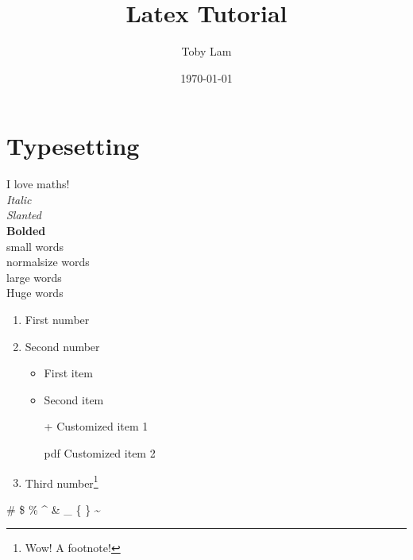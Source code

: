 \documentclass[a4paper]{report}
\begin{document}
\title{\Huge Latex Tutorial}
\author{Toby Lam}
\date{\today}
\maketitle

\tableofcontents

\newpage

\chapter{Typesetting}
\label{interests}

\indent
\indent
I love maths! \\

\noindent
\textit{Italic} \\
\textsl{Slanted} \\
\textbf{Bolded} \\

\noindent
{\small small words} \\
{\normalsize normalsize words} \\
{\large large words} \\

\vspace{2pt}
\noindent
{\huge Huge \hspace{10pt} words} \\

\normalsize

\begin{enumerate}
	\item First number
	\item Second number
	\begin{itemize}
		\item First item
		\item Second item
		\item[+] Customized item 1
		\item[pdf] Customized item 2
	\end{itemize}
	\item Third number\footnote{Wow! A footnote!}
\end{enumerate}

 \#  \$  \%  \^{} \&  \_  \{  \}  \~{} \\
\end{document}
